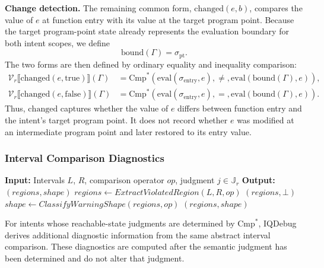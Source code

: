 \documentclass[11pt,oneside]{report}
\theoremstyle{plain}
\theoremstyle{definition}
\theoremstyle{remark}
\begin{document}
\smallskip
\noindent\textbf{Change detection.}
The remaining common form, \(\mathrm{changed}(e,b)\), compares the value of \(e\) at function entry with its value at the target program point.
Because the target program-point state already represents the evaluation boundary for both intent scopes, we define
\[
\mathrm{bound}(\Gamma)
=
\sigma_{\text{pt}}.
\]
The two forms are then defined by ordinary equality and inequality comparison:
\begin{align*}
\mathcal{V}_{r}\llbracket
\mathrm{changed}(e,\mathrm{true})
\rrbracket(\Gamma)
&=
\mathrm{Cmp}^{*}\!\left(
\mathrm{eval}(\sigma_{\text{entry}},e),
\neq,
\mathrm{eval}(\mathrm{bound}(\Gamma),e)
\right),
\\[3pt]
%
\mathcal{V}_{r}\llbracket
\mathrm{changed}(e,\mathrm{false})
\rrbracket(\Gamma)
&=
\mathrm{Cmp}^{*}\!\left(
\mathrm{eval}(\sigma_{\text{entry}},e),
=,
\mathrm{eval}(\mathrm{bound}(\Gamma),e)
\right).
\end{align*}
Thus, \(\mathrm{changed}\) captures whether the value of \(e\) differs between function entry and the intent's target program point.
It does not record whether \(e\) was modified at an intermediate program point and later restored to its entry value.

\subsubsection{Interval Comparison Diagnostics}
\label{sec:validation-engine}
\begin{algorithm}[!t]
\caption{Interval Comparison Diagnostics for
$\mathrm{Cmp}^{*}$-based Intents}
\label{alg:comparison-diagnostics}
\begin{algorithmic}[1]
\State \textbf{Input:} Intervals $L$, $R$, comparison operator $op$,
       judgment $j\in\mathbb{J}_{r}$
\State \textbf{Output:} $(\mathit{regions},\mathit{shape})$
\State $\mathit{regions} \gets \mathit{ExtractViolatedRegion}(L,R,op)$
    \State \Return $(\mathit{regions},\bot)$
\EndIf
\State $\mathit{shape} \gets
       \mathit{ClassifyWarningShape}(\mathit{regions},op)$
\State \Return $(\mathit{regions},\mathit{shape})$
\end{algorithmic}
\end{algorithm}

For intents whose reachable-state judgments are determined by
$\mathrm{Cmp}^{*}$, IQDebug derives additional diagnostic information from the
same abstract interval comparison.
These diagnostics are computed after the semantic judgment has been determined
and do not alter that judgment.
\end{document}
